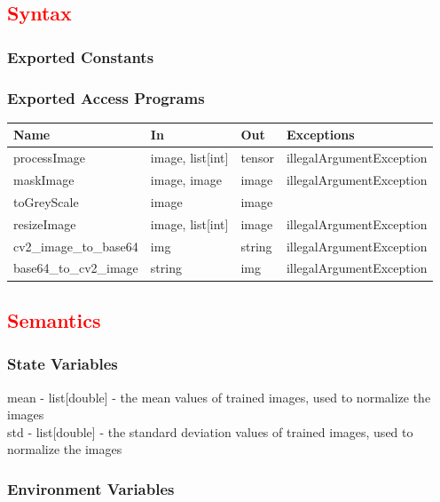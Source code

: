\documentclass[12pt, titlepage]{article}
\begin{document}
\subsection{\textcolor{red}{Syntax}}

\subsubsection{Exported Constants}
\subsubsection{Exported Access Programs}

\begin{center}
\begin{tabular}{p{4cm} p{3cm} p{4cm} p{4cm}}
\hline
\textbf{Name} & \textbf{In} & \textbf{Out} & \textbf{Exceptions} \\
\hline
processImage & image, list[int] & tensor & illegalArgumentException \\
maskImage & image, image & image  & illegalArgumentException \\
toGreyScale & image & image & \\
resizeImage & image, list[int] & image & illegalArgumentException \\
cv2\_image\_to\_base64 & img & string & illegalArgumentException & \\
base64\_to\_cv2\_image & string & img & illegalArgumentException & \\
\hline
\end{tabular}
\end{center}

\subsection{\textcolor{red}{Semantics}}

\subsubsection{State Variables}
mean - list[double] - the mean values of trained images, used to normalize the images \\
std - list[double] - the standard deviation values of trained images, used to normalize the images \\

\subsubsection{Environment Variables}
\end{document}
